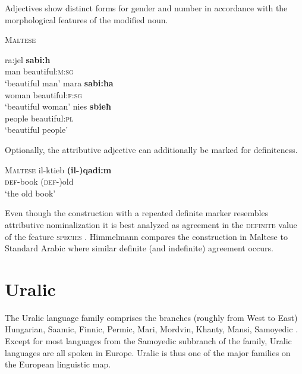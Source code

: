 Adjectives show distinct forms for gender and number in accordance with the morphological features of the modified noun.
\begin{exe}
\ex \textsc{Maltese} \citep[328]{aquilina1959}
\begin{xlist}
\ex
\gll	ra:jel \textbf{sabi:ħ}\\
	man beautiful:\textsc{m:sg}\\
\glt	‘beautiful man’
\ex
\gll	mara \textbf{sabi:ħa}\\
	woman beautiful:\textsc{f:sg}\\
\glt	‘beautiful woman’
\ex
\gll	nies \textbf{sbieħ}\\
	people beautiful:\textsc{pl}\\
\glt	‘beautiful people’
\end{xlist}
\end{exe}
Optionally, the attributive adjective can additionally be marked for definiteness. \begin{exe}
\ex \textsc{Maltese} \citep[330]{aquilina1959} 
\gll	il-ktieb \textbf{(il-)qadi:m}\\
	\textsc{def}-book	(\textsc{def-})old\\
\glt	‘the old book’
\end{exe}
Even though the construction with a repeated definite marker resembles attributive nominalization it is best analyzed as agreement in the \textsc{definite} value of the feature \textsc{species} \citep[179]{himmelmann1997}. Himmelmann compares the construction in Maltese to Standard Arabic where similar definite (and indefinite) agreement occurs.
				
\section{Uralic}\label{uralic synchr}
The Uralic language family comprises the branches (roughly from West to East) Hungarian, Saamic, Finnic, Permic, Mari, Mordvin, Khanty, Mansi, Samoyedic \cite[216–218]{salminen2007}. Except for most languages from the Samoyedic subbranch of the family, Uralic languages are all spoken in Europe. Uralic is thus one of the major families on the European linguistic map.\\

